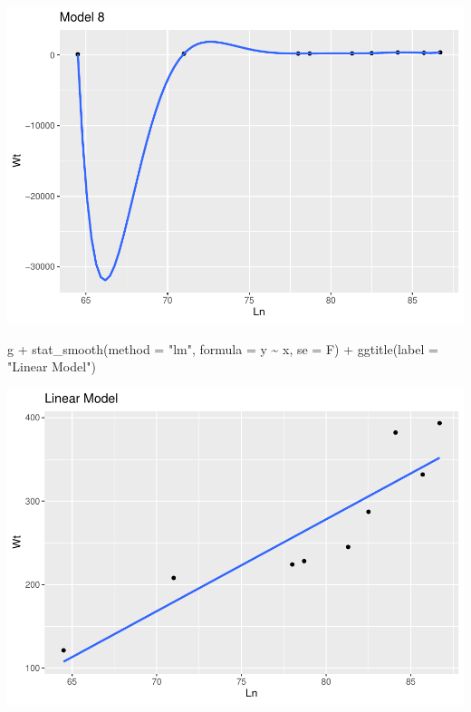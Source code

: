 \documentclass[
]{article}
\newenvironment{Shaded}{\begin{snugshade}}{\end{snugshade}}
\newcommand{\AttributeTok}[1]{\textcolor[rgb]{0.77,0.63,0.00}{#1}}
\newcommand{\FunctionTok}[1]{\textcolor[rgb]{0.00,0.00,0.00}{#1}}
\newcommand{\NormalTok}[1]{#1}
\newcommand{\SpecialCharTok}[1]{\textcolor[rgb]{0.00,0.00,0.00}{#1}}
\newcommand{\StringTok}[1]{\textcolor[rgb]{0.31,0.60,0.02}{#1}}
\begin{document}
\includegraphics{Class_Exercises_ClassNotes_5_files/figure-latex/unnamed-chunk-51-1.pdf}
\newpage

\begin{Shaded}
\begin{Highlighting}[]
\NormalTok{g }\SpecialCharTok{+} \FunctionTok{stat\_smooth}\NormalTok{(}\AttributeTok{method =} \StringTok{"lm"}\NormalTok{, }\AttributeTok{formula =}\NormalTok{ y }\SpecialCharTok{\textasciitilde{}}\NormalTok{ x, }\AttributeTok{se =}\NormalTok{ F) }\SpecialCharTok{+}
  \FunctionTok{ggtitle}\NormalTok{(}\AttributeTok{label =} \StringTok{"Linear Model"}\NormalTok{)}
\end{Highlighting}
\end{Shaded}

\includegraphics{Class_Exercises_ClassNotes_5_files/figure-latex/unnamed-chunk-52-1.pdf}
\newpage
\end{document}
